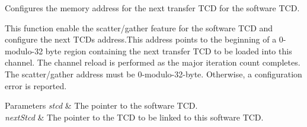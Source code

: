 Configures the memory address for the next transfer T\+CD for the software T\+CD. 

This function enable the scatter/gather feature for the software T\+CD and configure the next T\+CD\textquotesingle{}s address.\+This address points to the beginning of a 0-\/modulo-\/32 byte region containing the next transfer T\+CD to be loaded into this channel. The channel reload is performed as the major iteration count completes. The scatter/gather address must be 0-\/modulo-\/32-\/byte. Otherwise, a configuration error is reported.


\begin{DoxyParams}{Parameters}
{\em stcd} & The pointer to the software T\+CD. \\
\hline
{\em next\+Stcd} & The pointer to the T\+CD to be linked to this software T\+CD. \\
\hline
\end{DoxyParams}
